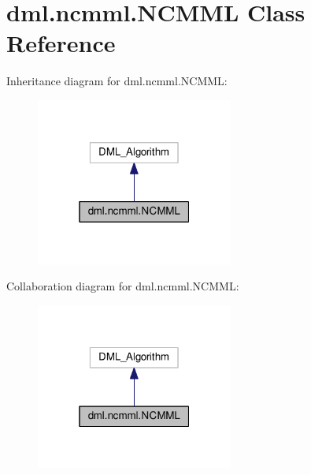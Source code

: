 \hypertarget{classdml_1_1ncmml_1_1NCMML}{}\section{dml.\+ncmml.\+N\+C\+M\+ML Class Reference}
\label{classdml_1_1ncmml_1_1NCMML}


Inheritance diagram for dml.\+ncmml.\+N\+C\+M\+ML\+:
\nopagebreak
\begin{figure}[H]
\begin{center}
\leavevmode
\includegraphics[width=184pt]{classdml_1_1ncmml_1_1NCMML__inherit__graph}
\end{center}
\end{figure}


Collaboration diagram for dml.\+ncmml.\+N\+C\+M\+ML\+:
\nopagebreak
\begin{figure}[H]
\begin{center}
\leavevmode
\includegraphics[width=184pt]{classdml_1_1ncmml_1_1NCMML__coll__graph}
\end{center}
\end{figure}
